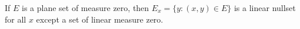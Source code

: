 If $E$ is a plane set of measure zero, then $E_x = \{y : (x, y) \in E\}$ is a linear nullset for all $x$ except a set of linear measure zero.
